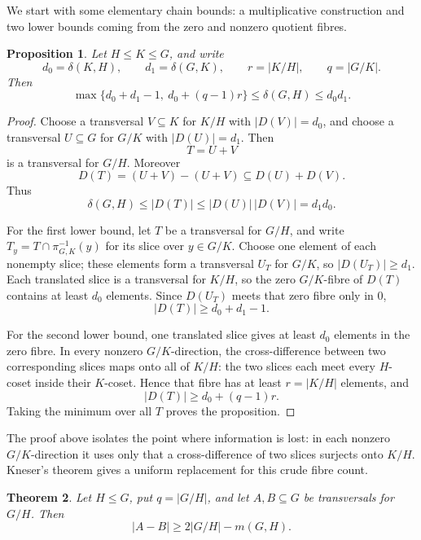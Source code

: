 \documentclass[reqno]{amsart}
\numberwithin{equation}{section}
\newtheorem{theorem}{Theorem}[section]
\newtheorem{proposition}[theorem]{Proposition}
\theoremstyle{definition}
\begin{document}
We start with some elementary chain bounds: a multiplicative construction and
two lower bounds coming from the zero and nonzero quotient fibres.
\begin{proposition}
\label{prop:chain-inequalities}
Let
$
  H\leq K\leq G$,
and write
\[
  d_0=\delta(K,H),
  \qquad
  d_1=\delta(G,K),
  \qquad
  r=|K/H|,
  \qquad
  q=|G/K|.
\]
Then
\[
\max\{d_0+d_1-1,\ d_0+(q-1)r\} \leq  \delta(G,H)\leq d_0d_1.
\]
\end{proposition}

\begin{proof}
Choose a transversal $V\subseteq K$ for $K/H$ with $|D(V)|=d_0$, and choose a
transversal $U\subseteq G$ for $G/K$ with $|D(U)|=d_1$.  Then
\[
  T=U+V
\]
is a transversal for $G/H$.  Moreover
\[
  D(T)=(U+V)-(U+V)\subseteq D(U)+D(V).
\]
Thus
\[
  \delta(G,H)\leq |D(T)|\leq |D(U)|\,|D(V)|=d_1d_0.
\]

For the first lower bound, let $T$ be a transversal for $G/H$, and write
\(T_y=T\cap \pi_{G,K}^{-1}(y)\) for its slice over \(y\in G/K\).  Choose one
element of each nonempty slice; these elements form a transversal $U_T$ for
$G/K$, so $|D(U_T)|\ge d_1$.  Each translated slice is a transversal for
\(K/H\), so the zero $G/K$-fibre of $D(T)$ contains at least \(d_0\) elements.
Since $D(U_T)$ meets that zero fibre only in $0$,
\[
  |D(T)|\geq d_0+d_1-1.
\]

For the second lower bound, one translated slice gives at least $d_0$ elements
in the zero fibre.  In every nonzero $G/K$-direction, the cross-difference
between two corresponding slices maps onto all of \(K/H\): the two slices each
meet every \(H\)-coset inside their \(K\)-coset.  Hence that fibre has at least
$r=|K/H|$ elements, and
\[
  |D(T)|\geq d_0+(q-1)r.
\]
Taking the minimum over all $T$ proves the proposition.
\end{proof}

The proof above isolates the point where information is lost: in each nonzero
$G/K$-direction it uses only that a cross-difference of two slices surjects onto
$K/H$.  Kneser's theorem gives a uniform replacement for this crude fibre count.

\begin{theorem}
\label{thm:kneser-cross-transversal}
Let $H\leq G$, put $q=|G/H|$, and let $A,B\subseteq G$ be transversals for
$G/H$.  Then
\[
  |A-B|\geq 2|G/H|-m(G,H).
\]
\end{theorem}
\end{document}

